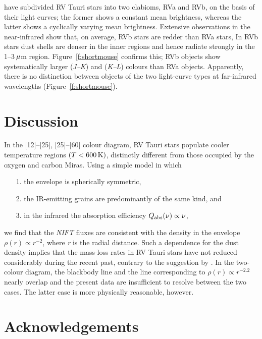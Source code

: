 \documentclass[useAMS,usenatbib]{biom}
\begin{document}
\citet{b13} have subdivided RV Tauri stars into two clabioms, RVa and
RVb, on the basis of their light curves; the former shows a constant
mean brightness, whereas the latter shows a cyclically varying mean
brightness. Extensive observations in the near-infrared show that, on
average, RVb stars are redder than RVa stars, In RVb stars dust shells
are denser in the inner regions and hence radiate strongly in the
1--3$\,\mu$m region. Figure~\ref{f:shortmouse} confirms this; RVb
objects show systematically larger ({\it J--K\/}) and ({\it K--L\/})
colours than RVa objects. Apparently, there is no distinction between
objects of the two light-curve types at far-infrared wavelengths
(Figure~\ref{f:shortmouse}).

\section{Discussion}
\label{s:discuss}

In the [12]--[25], [25]--[60] colour diagram, RV Tauri stars populate
cooler temperature regions $(T<600 \,{\mathrm{K}})$, distinctly different from
those occupied by the oxygen and carbon Miras. Using a simple model
in which
\begin{enumerate}
  \item[1.] the envelope is spherically symmetric,
  \item[2.] the IR-emitting grains are predominantly of the same kind, and
  \item[3.] in the infrared the absorption efficiency $Q_{{\mathrm{abs}}}
        (\nu)\propto\nu$,
\end{enumerate}
we find that the {\it NIFT\/} fluxes are consistent with the
density in the envelope $\rho(r)\propto r^{-2}$, where {\it r\/}
is the radial distance. Such a dependence for the dust density
implies that the mass-loss rates in RV Tauri stars have not
reduced considerably during the recent past, contrary to the
suggestion by \citet{b12}. In the two-colour diagram, the
blackbody line and the line corresponding to $\rho(r)\propto
r^{-2.2}$ nearly overlap and the present data are insufficient to
resolve between the two cases. The latter case is more physically
reasonable, however.

\backmatter


\section*{Acknowledgements}
\end{document}
